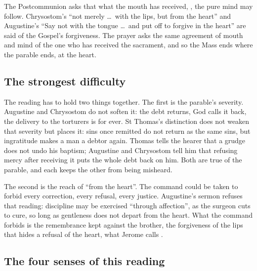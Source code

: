 The Postcommunion asks that what the mouth has received, , the pure mind may follow. Chrysostom's ``not merely \dots\ with the
lips, but from the heart'' and Augustine's ``Say not with the tongue \dots\ and put
off to forgive in the heart'' are said of the Gospel's forgiveness. The prayer
asks the same agreement of mouth and mind of the one who has received the
sacrament, and so the Mass ends where the parable ends, at the heart.

\subsection{The strongest difficulty}

The reading has to hold two things together. The first is the parable's
severity. Augustine and Chrysostom do not soften it: the debt returns, God calls it
back, the delivery to the torturers is for ever. St Thomas's distinction does not
weaken that severity but places it: sins once remitted do not return as the same
sins, but ingratitude makes a man a debtor again. Thomas tells the hearer that a
grudge does not undo his baptism; Augustine and Chrysostom tell him that refusing
mercy after receiving it puts the whole debt back on him. Both are true of the
parable, and each keeps the other from being misheard.

The second is the reach of ``from the heart''. The command could be taken to
forbid every correction, every refusal, every justice. Augustine's sermon refuses
that reading: discipline may be exercised ``through affection'', as the surgeon
cuts to cure, so long as gentleness does not depart from the heart. What the
command forbids is the remembrance kept against the brother, the forgiveness of
the lips that hides a refusal of the heart, what Jerome calls .

\subsection{The four senses of this reading}

